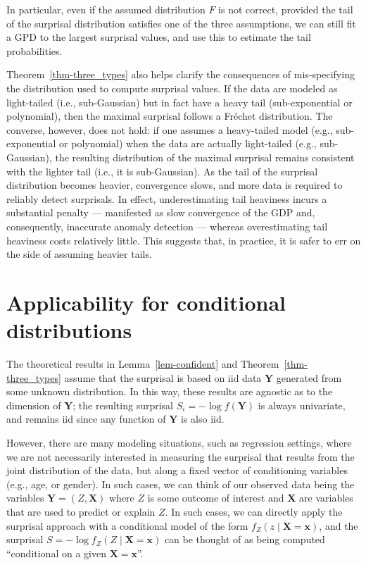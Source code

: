 \documentclass[
  12pt]{article}
\theoremstyle{plain}
\theoremstyle{plain}
\theoremstyle{definition}
\theoremstyle{plain}
\theoremstyle{remark}
\begin{document}
In particular, even if the assumed distribution \(F\) is not correct,
provided the tail of the surprisal distribution satisfies one of the
three assumptions, we can still fit a GPD to the largest surprisal
values, and use this to estimate the tail probabilities.

Theorem~\ref{thm-three_types} also helps clarify the consequences of
mis-specifying the distribution used to compute surprisal values. If the
data are modeled as light-tailed (i.e., sub-Gaussian) but in fact have a
heavy tail (sub-exponential or polynomial), then the maximal surprisal
follows a Fréchet distribution. The converse, however, does not hold: if
one assumes a heavy-tailed model (e.g., sub-exponential or polynomial)
when the data are actually light-tailed (e.g., sub-Gaussian), the
resulting distribution of the maximal surprisal remains consistent with
the lighter tail (i.e., it is sub-Gaussian). As the tail of the
surprisal distribution becomes heavier, convergence slows, and more data
is required to reliably detect surprisals. In effect, underestimating
tail heaviness incurs a substantial penalty --- manifested as slow
convergence of the GDP and, consequently, inaccurate anomaly detection
--- whereas overestimating tail heaviness costs relatively little. This
suggests that, in practice, it is safer to err on the side of assuming
heavier tails.

\section{Applicability for conditional
distributions}\label{sec-conditional}

The theoretical results in Lemma~\ref{lem-confident} and
Theorem~\ref{thm-three_types} assume that the surprisal is based on iid
data \(\bm{Y}\) generated from some unknown distribution. In this way,
these results are agnostic as to the dimension of \(\bm{Y}\); the
resulting surprisal \(S_i=-\log f(\bm{Y})\) is always univariate, and
remains iid since any function of \(\bm{Y}\) is also iid.

However, there are many modeling situations, such as regression
settings, where we are not necessarily interested in measuring the
surprisal that results from the joint distribution of the data, but
along a fixed vector of conditioning variables (e.g., age, or gender).
In such cases, we can think of our observed data being the variables
\(\bm{Y}=(Z,\bm{X})\) where \(Z\) is some outcome of interest and
\(\bm{X}\) are variables that are used to predict or explain \(Z\). In
such cases, we can directly apply the surprisal approach with a
conditional model of the form \(f_Z(z\mid \bm{X}=\bm{x})\), and the
surprisal \(S=-\log f_Z(Z\mid \bm{X}=\bm{x})\) can be thought of as
being computed ``conditional on a given \(\bm{X}=\bm{x}\)''.
\end{document}
